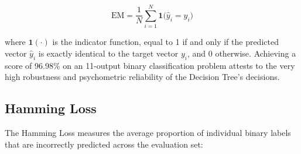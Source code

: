 \documentclass[12pt,a4paper]{report}
\begin{document}
\begin{equation}
  \text{EM} = \frac{1}{N} \sum_{i=1}^{N} \mathbf{1}\bigl(\hat{y}_i = y_i\bigr)
  \label{eq:em}
\end{equation}

where $\mathbf{1}(\cdot)$ is the indicator function, equal to 1 if and only if the predicted vector $\hat{y}_i$ is exactly identical to the target vector $y_i$, and 0 otherwise. Achieving a score of 96.98\% on an 11-output binary classification problem attests to the very high robustness and psychometric reliability of the Decision Tree's decisions.

\subsection{Hamming Loss}

The Hamming Loss measures the average proportion of individual binary labels that are incorrectly predicted across the evaluation set:
\end{document}
